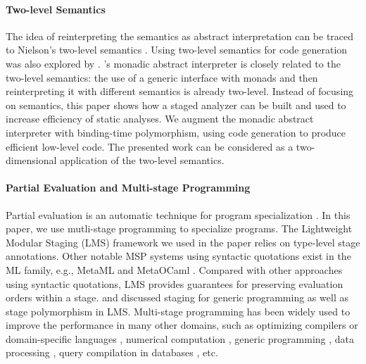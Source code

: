 \paragraph{Two-level Semantics} The idea of reinterpreting the semantics as
abstract interpretation can be traced to Nielson's two-level semantics
\cite{NIELSON1989117}. Using two-level semantics for code generation
was also explored by \citet{NIELSON198859}.
\citet{Sergey:2013:MAI:2491956.2491979}'s monadic abstract
interpreter is closely related to the two-level semantics: the
use of a generic interface with monads and then reinterpreting it with
different semantics is already two-level. Instead of focusing on
semantics, this paper shows how a staged analyzer can be built and
used to increase efficiency of static analyses. We augment the monadic
abstract interpreter with binding-time polymorphism, using code generation to
produce efficient low-level code. The presented work can be considered as
a two-dimensional application of the two-level semantics.

\paragraph{Partial Evaluation and Multi-stage Programming}
Partial evaluation is an automatic technique for program
specialization \cite{10.1007/3-540-61580-6_11, DBLP:books/daglib/0072559}.
In this paper, we use mutli-stage programming to specialize programs.
The Lightweight Modular Staging (LMS) framework
\cite{DBLP:conf/gpce/RompfO10} we used in the paper relies on
type-level stage annotations.  Other notable MSP systems using syntactic
quotations exist in the ML family, e.g., MetaML \cite{DBLP:conf/pepm/TahaS97}
and MetaOCaml \cite{DBLP:conf/gpce/CalcagnoTHL03, DBLP:conf/flops/Kiselyov14}. 
Compared with other approaches using syntactic quotations, LMS provides
guarantees for preserving evaluation orders within a stage.
\citet{Ofenbeck:2017:SGP:3136040.3136060} and
\citet{Amin:2017:CTI:3177123.3158140} discussed staging for generic programming
as well as stage polymorphism in LMS.
Multi-stage programming has been widely used to improve the
performance in many other domains, such as optimizing compilers or
domain-specific languages \cite{DBLP:conf/pldi/RompfSBLCO14,
  DBLP:conf/snapl/RompfBLSJAOSKDK15,
  DBLP:journals/tecs/SujeethBLRCOO14, DBLP:conf/gpce/SujeethGBLROO13,
  DBLP:journals/jfp/CaretteKS09}, numerical computation \cite{PGL-038,
  DBLP:conf/pepm/AktemurKKS13}, generic programming
\cite{DBLP:journals/pacmpl/Yallop17,
  Ofenbeck:2017:SGP:3136040.3136060}, data processing
\cite{DBLP:conf/oopsla/JonnalageddaCSRO14,
  DBLP:conf/popl/KiselyovBPS17}, query compilation in databases
\cite{DBLP:conf/osdi/EssertelTDBOR18, DBLP:conf/sigmod/TahboubER18, Rompf:2015:FPS:2784731.2784760},
etc.

